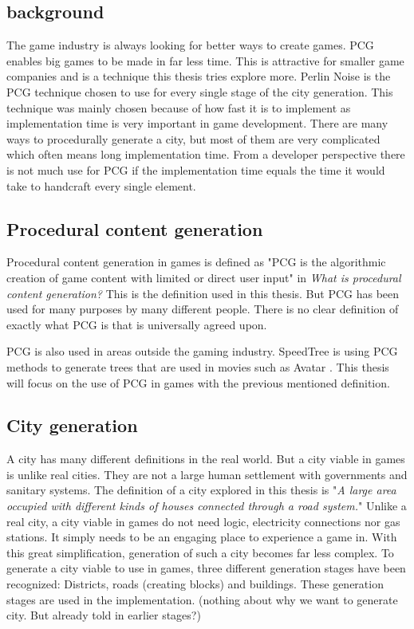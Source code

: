 	\subsection{background}
	The game industry is always looking for better ways to create games. PCG enables big games to be made in far less time. This is attractive for smaller game companies and is a technique this thesis tries explore more.
	Perlin Noise is the PCG technique chosen to use for every single stage of the city generation. This technique was mainly chosen because of how fast it is to implement as implementation time is very important in game development.
	There are many ways to procedurally generate a city, but most of them are very complicated which often means long implementation time. From a developer perspective there is not much use for PCG if the implementation time equals the time it would take to handcraft every single element.
	
	\subsection{Procedural content generation}
	Procedural content generation in games is defined as "PCG is the algorithmic creation of game content with limited or direct user input" in \textit{What is procedural content generation?} \cite{WhatIsPCG} This is the definition used in this thesis. But PCG has been used for many purposes by many different people. There is no clear definition of exactly what PCG is that is universally agreed upon.\cite{WhatIsPCG}
	
	PCG is also used in areas outside the gaming industry. SpeedTree \cite{SpeedTree} is using PCG methods to generate trees that are used in movies such as Avatar \cite{SpeedTreeMovies}.
	This thesis will focus on the use of PCG in games with the previous mentioned definition.
	
	\subsection{City generation}
	A city has many different definitions in the real world. But a city viable in games is unlike real cities. They are not a large human settlement with governments and sanitary systems. The definition of a city explored in this thesis is "\textit{A large area occupied with different kinds of houses connected through a road system.}"
	Unlike a real city, a city viable in games do not need logic, electricity connections nor gas stations. It simply needs to be an engaging place to experience a game in. With this great simplification, generation of such a city becomes far less complex.
	To generate a city viable to use in games, three different generation stages have been recognized: Districts, roads (creating blocks) and buildings. These generation stages are used in the implementation. (nothing about why we want to generate city. But already told in earlier stages?)
	
